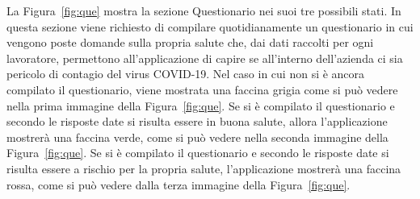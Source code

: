 \begin{trivlist}
	La Figura~\ref{fig:que} mostra la sezione Questionario nei suoi tre possibili stati. In questa sezione viene richiesto di compilare quotidianamente un questionario in cui vengono poste domande sulla propria salute che, dai dati raccolti per ogni lavoratore, permettono all'applicazione di capire se all'interno dell'azienda ci sia pericolo di contagio del virus COVID-19. Nel caso in cui non si è ancora compilato il questionario, viene mostrata una faccina grigia come si può vedere nella prima immagine della Figura~\ref{fig:que}. Se si è compilato il questionario e secondo le risposte date si risulta essere in buona salute, allora l'applicazione mostrerà una faccina verde, come si può vedere nella seconda immagine della Figura~\ref{fig:que}. Se si è compilato il questionario e secondo le risposte date si risulta essere a rischio per la propria salute, l'applicazione mostrerà una faccina rossa, come si può vedere dalla terza immagine della Figura~\ref{fig:que}.
	

\end{trivlist}

